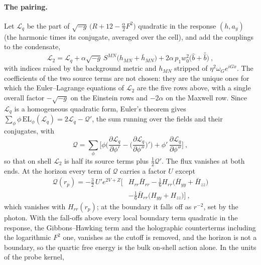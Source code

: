 \paragraph{The pairing.} Let $\mathcal{L}_q$ be the part of
$\sqrt{-g}\,\big(R + 12 - \tfrac{\alpha}{2}F^2\big)$ quadratic in the
response $(h, a_y)$ (the harmonic times its conjugate, averaged over
the cell), and add the couplings to the condensate,
\begin{equation}
\mathcal{L}_2 = \mathcal{L}_q + \alpha\sqrt{-g}\,S^{MN}\big(h_{MN} + \bar h_{MN}\big)
+ 2\alpha\,p_1w_0^2\big(\hat b + \bar{\hat b}\big)~,
\end{equation}
with indices raised by the background metric and $h_{MN}$ stripped of
$\eta^2\omega_Ge^{iGx}$. The coefficients of the two source terms are not
chosen: they are the unique ones for which the Euler--Lagrange equations of
$\mathcal{L}_2$ are the five rows above, with a single overall factor
$-\sqrt{-g}$ on the Einstein rows and $-2\alpha$ on the Maxwell row.
Since $\mathcal{L}_q$ is a homogeneous quadratic form, Euler's theorem gives
$\sum_\phi \phi\,\mathrm{EL}_\phi(\mathcal{L}_q) = 2\mathcal{L}_q - \mathcal{Q}'$, the sum running over the fields and their conjugates, with
\begin{equation}
\mathcal{Q} = \sum_\phi\Big[\phi\Big(\frac{\partial\mathcal{L}_q}{\partial\phi'}
- \Big(\frac{\partial\mathcal{L}_q}{\partial\phi''}\Big)'\Big)
+ \phi'\,\frac{\partial\mathcal{L}_q}{\partial\phi''}\Big]~,
\end{equation}
so that on shell $\mathcal{L}_2$ is half its source terms plus
$\tfrac12\mathcal{Q}'$. The flux vanishes at both ends. At the horizon every
term of $\mathcal{Q}$ carries a factor $U$ except
\begin{equation}
\begin{split}
\mathcal{Q}(r_p) = -\tfrac32\,U'e^{2V+Z}\Big[&H_{rr}\bar H_{rr} - \tfrac16 H_{rr}\big(\bar H_{yy} + \bar H_{zz}\big) \\
&- \tfrac16\bar H_{rr}\big(H_{yy} + H_{zz}\big)\Big]~,
\end{split}
\end{equation}
which vanishes with $H_{rr}(r_p)$; at the boundary it falls off as $r^{-2}$,
set by the photon. With the fall-offs above every local boundary term
quadratic in the response, the Gibbons--Hawking term and the holographic
counterterms including the logarithmic $F^2$ one, vanishes as the cutoff is
removed, and the horizon is not a boundary, so the quartic free energy is
the bulk on-shell action alone. In the units of the probe kernel,
